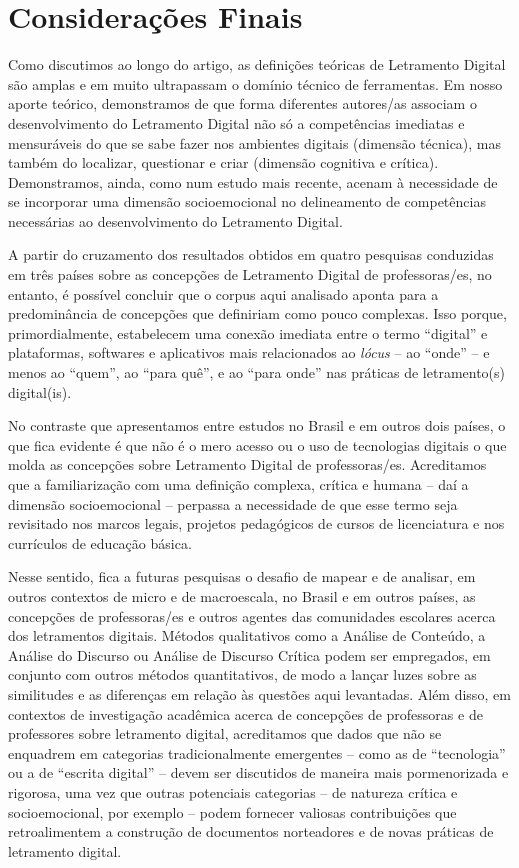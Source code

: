 \documentclass[portuguese]{textolivre}
\begin{document}
\section{Considerações Finais}

Como discutimos ao longo do artigo, as definições teóricas de Letramento Digital são amplas e em muito ultrapassam o domínio técnico de ferramentas. Em nosso aporte teórico, demonstramos de que forma diferentes autores/as associam o desenvolvimento do Letramento Digital não só a competências imediatas e mensuráveis do que se sabe fazer nos ambientes digitais (dimensão técnica), mas também do localizar, questionar e criar (dimensão cognitiva e crítica). Demonstramos, ainda, como num estudo mais recente, \textcite{list_framework_2020} acenam à necessidade de se incorporar uma dimensão socioemocional no delineamento de competências necessárias ao desenvolvimento do Letramento Digital.

A partir do cruzamento dos resultados obtidos em quatro pesquisas conduzidas em três países sobre as concepções de Letramento Digital de professoras/es, no entanto, é possível concluir que o corpus aqui analisado aponta para a predominância de concepções que \textcite{list_framework_2020} definiriam como pouco complexas. Isso porque, primordialmente, estabelecem uma conexão imediata entre o termo “digital” e plataformas, softwares e aplicativos mais relacionados ao \textit{lócus} – ao “onde” – e menos ao “quem”, ao “para quê”, e ao “para onde” nas práticas de letramento(s) digital(is).

No contraste que apresentamos entre estudos no Brasil e em outros dois países, o que fica evidente é que não é o mero acesso ou o uso de tecnologias digitais o que molda as concepções sobre Letramento Digital de professoras/es. Acreditamos que a familiarização com uma definição complexa, crítica e humana – daí a dimensão socioemocional – perpassa a necessidade de que esse termo seja revisitado nos marcos legais, projetos pedagógicos de cursos de licenciatura e nos currículos de educação básica.

Nesse sentido, fica a futuras pesquisas o desafio de mapear e de analisar, em outros contextos de micro e de macroescala, no Brasil e em outros países, as concepções de professoras/es e outros agentes das comunidades escolares acerca dos letramentos digitais. Métodos qualitativos como a Análise de Conteúdo, a Análise do Discurso ou Análise de Discurso Crítica podem ser empregados, em conjunto com outros métodos quantitativos, de modo a lançar luzes sobre as similitudes e as diferenças em relação às questões aqui levantadas. Além disso, em contextos de investigação acadêmica acerca de concepções de professoras e de professores sobre letramento digital, acreditamos que dados que não se enquadrem em categorias tradicionalmente emergentes – como as de “tecnologia” ou a de “escrita digital” – devem ser discutidos de maneira mais pormenorizada e rigorosa, uma vez que outras potenciais categorias – de natureza crítica e socioemocional, por exemplo – podem fornecer valiosas contribuições que retroalimentem a construção de documentos norteadores e de novas práticas de letramento digital.
\end{document}
